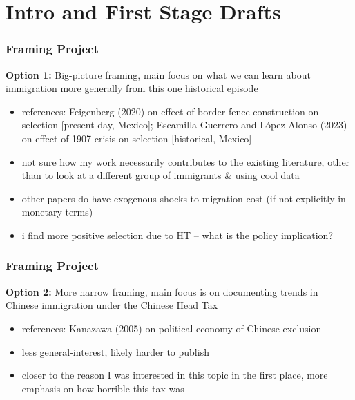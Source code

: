 \documentclass[xcolor=dvipsnames, compress, 12pt, aspectratio=169, handout]{beamer}
\begin{document}
\section{Intro and First Stage Drafts}
\begin{frame}
    \frametitle{Framing Project}
        \textbf{Option 1:} Big-picture framing, main focus on what we can learn about immigration more generally from this one historical episode 
        \begin{itemize}
            \item references: Feigenberg (2020) on effect of border fence construction on selection [present day, Mexico]; Escamilla-Guerrero and López-Alonso (2023) on effect of 1907 crisis on selection [historical, Mexico]
            \item not sure how my work necessarily contributes to the existing literature, other than to look at a different group of immigrants \& using cool data 
            \item other papers do have exogenous shocks to migration cost (if not explicitly in monetary terms) 
            \item i find more positive selection due to HT -- what is the policy implication?
        \end{itemize}
\end{frame}

\begin{frame}
    \frametitle{Framing Project}
    \textbf{Option 2:} More narrow framing, main focus is on documenting trends in Chinese immigration under the Chinese Head Tax
        \begin{itemize}
            \item references: Kanazawa (2005) on political economy of Chinese exclusion
            \item less general-interest, likely harder to publish 
            \item closer to the reason I was interested in this topic in the first place, more emphasis on how horrible this tax was 
        \end{itemize}
\end{frame}
\end{document}
